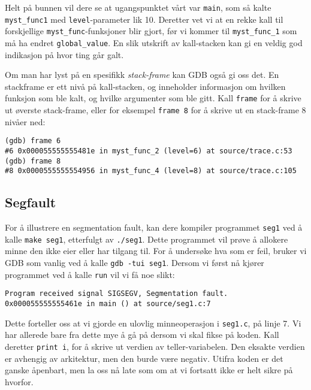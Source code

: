 Helt på bunnen vil dere se at ugangspunktet vårt var \verb|main|, som så kalte \verb|myst_func1| med \verb|level|-parameter lik 10. Deretter vet vi at en rekke kall til forskjellige \verb|myst_func|-funksjoner blir gjort, før vi kommer til \verb|myst_func_1| som må ha endret \verb|global_value|. En slik utskrift av kall-stacken kan gi en veldig god indikasjon på hvor ting går galt.


Om man har lyst på en spesifikk \textit{stack-frame} kan GDB også gi oss det. En stackframe er ett nivå på kall-stacken, og inneholder informasjon om hvilken funksjon som ble kalt, og hvilke argumenter som ble gitt. Kall \verb|frame| for å skrive ut øverste stack-frame, eller for eksempel \verb|frame 8| for å skrive ut en stack-frame 8 nivåer ned:

\begin{lstlisting}[mathescape=true,keywordstyle=\color{black}]
(gdb) frame 6
#6 0x000055555555481e in myst_func_2 (level=6) at source/trace.c:53
(gdb) frame 8
#8 0x0000555555554956 in myst_func_4 (level=8) at source/trace.c:105
\end{lstlisting}


\subsection{Segfault}

For å illustrere en segmentation fault, kan dere kompiler programmet \verb|seg1| ved å kalle \verb|make seg1|, etterfulgt av \verb|./seg1|. Dette programmet vil prøve å allokere minne den ikke eier eller har tilgang til. For å undersøke hva som er feil, bruker vi GDB som vanlig ved å kalle \verb|gdb -tui seg1|. Dersom vi først nå kjører programmet ved å kalle \verb|run| vil vi få noe slikt:

\begin{lstlisting}[mathescape=true,keywordstyle=\color{black}]
Program received signal SIGSEGV, Segmentation fault.
0x000055555555461e in main () at source/seg1.c:7
\end{lstlisting}


Dette forteller oss at vi gjorde en ulovlig minneoperasjon i \verb|seg1.c|, på linje 7. Vi har allerede bare fra dette mye å gå på dersom vi skal fikse på koden. Kall deretter \verb|print i|, for å skrive ut verdien av teller-variabelen. Den eksakte verdien er avhengig av arkitektur, men den burde være negativ. Utifra koden er det ganske åpenbart, men la oss nå late som om at vi fortsatt ikke er helt sikre på hvorfor.

